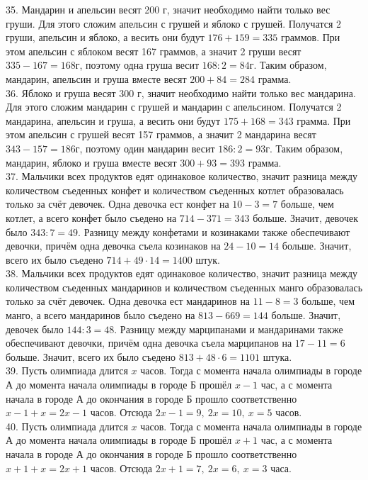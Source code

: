 \documentclass[12pt]{article}
\begin{document}
35. Мандарин и апельсин весят 200 г, значит необходимо найти только вес груши. Для этого сложим апельсин с грушей и яблоко с грушей. Получатся 2 груши, апельсин и яблоко, а весить они будут $176+159=335$ граммов. При этом апельсин с яблоком весят 167 граммов, а значит 2 груши весят $335-167=168$г, поэтому одна груша весит $168:2=84$г. Таким образом, мандарин, апельсин и груша вместе весят $200+84=284$ грамма.\\
36. Яблоко и груша весят 300 г, значит необходимо найти только вес мандарина. Для этого сложим мандарин с грушей и мандарин с апельсином. Получатся 2 мандарина, апельсин и груша, а весить они будут $175+168=343$ грамма. При этом апельсин с грушей весят 157 граммов, а значит 2 мандарина весят $343-157=186$г, поэтому один мандарин весит $186:2=93$г. Таким образом, мандарин, яблоко и груша вместе весят $300+93=393$ грамма.\\
37. Мальчики всех продуктов едят одинаковое количество, значит разница между количеством съеденных конфет и количеством съеденных котлет образовалась только за счёт девочек. Одна девочка ест конфет на $10-3=7$ больше, чем котлет, а всего конфет было съедено на $714-371=343$ больше. Значит, девочек было $343:7=49.$ Разницу между конфетами и козинаками также обеспечивают девочки, причём одна девочка съела козинаков на $24-10=14$ больше. Значит, всего их было съедено $714+49\cdot14=1400$ штук.\\
38. Мальчики всех продуктов едят одинаковое количество, значит разница между количеством съеденных мандаринов и количеством съеденных манго образовалась только за счёт девочек. Одна девочка ест мандаринов на $11-8=3$ больше, чем манго, а всего мандаринов было съедено на $813-669=144$ больше. Значит, девочек было $144:3=48.$ Разницу между марципанами и мандаринами также обеспечивают девочки, причём одна девочка съела марципанов на $17-11=6$ больше. Значит, всего их было съедено $813+48\cdot6=1101$ штука.\\
39. Пусть олимпиада длится $x$ часов. Тогда с момента начала олимпиады в городе А до момента начала олимпиады в городе Б прошёл $x-1$ час, а с момента начала в городе А до окончания в городе Б прошло соответственно $x-1+x=2x-1$ часов. Отсюда $2x-1=9,\ 2x=10,\ x=5$ часов.\\
40. Пусть олимпиада длится $x$ часов. Тогда с момента начала олимпиады в городе А до момента начала олимпиады в городе Б прошёл $x+1$ час, а с момента начала в городе А до окончания в городе Б прошло соответственно $x+1+x=2x+1$ часов. Отсюда $2x+1=7,\ 2x=6,\ x=3$ часа.\\
\end{document}
